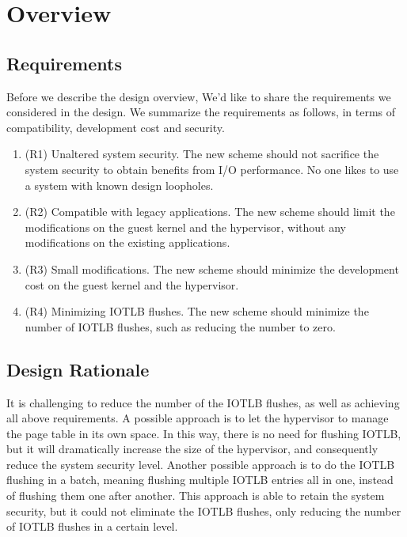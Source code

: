 \section{\name Overview} \label{sec:overview}
\subsection{Requirements}\label{sec:req}
Before we describe the design overview, We'd like to share the requirements we considered in the design.
We summarize the requirements as follows, in terms of compatibility, development cost and security.
\begin{enumerate}
\item (R1) Unaltered system security. The new scheme should not sacrifice the system security to obtain benefits from I/O performance. No one likes to use a system with known design loopholes.
\item (R2) Compatible with legacy applications. The new scheme should limit the modifications on the guest kernel and the hypervisor, without any modifications on the existing applications.
\item (R3) Small modifications. The new scheme should minimize the development cost on the guest kernel and the hypervisor.
\item (R4) Minimizing IOTLB flushes. The new scheme should minimize the number of IOTLB flushes, such as reducing the number to zero.
\end{enumerate}

\subsection{Design Rationale}\label{sec:rationale}
It is challenging to reduce the number of the IOTLB
flushes, as well as achieving all above requirements.
A possible approach is to let the hypervisor to manage the page table in its own space.
In this way, there is no need for flushing IOTLB, but it will dramatically increase the size of the hypervisor, and consequently reduce the system security level.
Another possible approach is to do the IOTLB flushing in a batch, meaning flushing multiple IOTLB entries all in one, instead of flushing them one after another.
This approach is able to retain the system security, but it could not eliminate the IOTLB flushes, only reducing the number of IOTLB flushes in a certain level.

